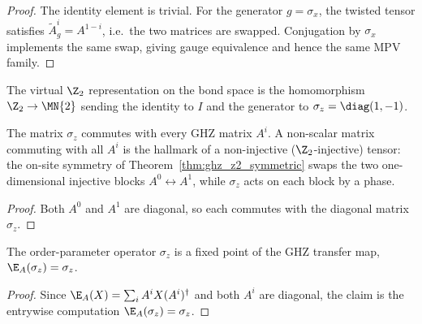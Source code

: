 \begin{proof}
    \leanok
    The identity element is trivial. For the generator
    $g = \sigma_x$, the twisted tensor satisfies
    $\widetilde A_g^i = A^{1-i}$, i.e.\ the two matrices are swapped.
    Conjugation by $\sigma_x$ implements the same swap, giving
    gauge equivalence and hence the same MPV family.
\end{proof}

\begin{definition}\label{def:ghz_virtual_z2_action}
    \leanok
    The virtual $\Z_2$ representation on the bond space is the homomorphism
    $\Z_2 \to \MN{2}$ sending the identity to $I$ and the generator to
    $\sigma_z = \diag(1, -1)$.
\end{definition}

\begin{theorem}\label{thm:ghz_virtual_z2}
    \leanok
    The matrix $\sigma_z$ commutes with every GHZ matrix $A^i$.  A non-scalar
    matrix commuting with all $A^i$ is the hallmark of a non-injective
    ($\Z_2$-injective) tensor: the on-site symmetry of
    Theorem~\ref{thm:ghz_z2_symmetric} swaps the two one-dimensional injective
    blocks $A^0 \leftrightarrow A^1$, while $\sigma_z$ acts on each block by a
    phase.
\end{theorem}

\begin{proof}
    \leanok
    Both $A^0$ and $A^1$ are diagonal, so each commutes with the diagonal
    matrix $\sigma_z$.
\end{proof}

\begin{theorem}\label{thm:ghz_order_param}
    \leanok
    The order-parameter operator $\sigma_z$ is a fixed point of the GHZ transfer
    map, $\E_A(\sigma_z) = \sigma_z$.
\end{theorem}

\begin{proof}
    \leanok
    Since $\E_A(X) = \sum_i A^i X (A^i)^{\dagger}$ and both $A^i$ are diagonal,
    the claim is the entrywise computation $\E_A(\sigma_z) = \sigma_z$.
\end{proof}

